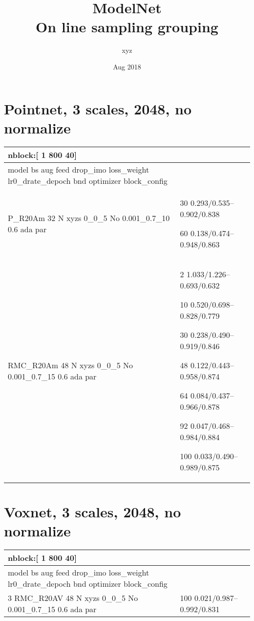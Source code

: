 \documentclass[,table,dvipsnames]{article}
\title{ModelNet \\On line sampling grouping}
\author{xyz}
\date{Aug 2018}
\begin{document}
\noindent
\begin{titlepage}
	\maketitle
\end{titlepage}	

\section{Pointnet, 3 scales, 2048, no normalize}
\noindent\begin{tabular}{|p{10cm}|p{5.5cm}| }	
\hline
nblock:[  1 800  40] &\\	\hline
model bs aug feed drop\_imo loss\_weight lr0\_drate\_depoch bnd optimizer block\_config& \\ \hline

\rowcolor{green!20}
 P\_R20Am 32 N xyzs 0\_0\_5 No 0.001\_0.7\_10 0.6 ada par & 30 0.293/0.535--0.902/0.838\par 60 0.138/0.474--0.948/0.863\\
 
\rowcolor{red!20}
RMC\_R20Am 48 N xyzs 0\_0\_5 No 0.001\_0.7\_15 0.6 ada par & 2 1.033/1.226--0.693/0.632\par 10 0.520/0.698--0.828/0.779\par 30 0.238/0.490--0.919/0.846 \par 48 0.122/0.443--0.958/0.874 \par 64 0.084/0.437--0.966/0.878 \par 92 0.047/0.468--0.984/0.884 \par 100 0.033/0.490--0.989/0.875\\
\hline 	
\end{tabular}



\section{Voxnet, 3 scales, 2048, no normalize}
\noindent\begin{tabular}{|p{10cm}|p{5.5cm}| }	
	\hline
	nblock:[  1 800  40] &\\	\hline
	model bs aug feed drop\_imo loss\_weight lr0\_drate\_depoch bnd optimizer block\_config& \\ \hline
	
	\rowcolor{green!20}
	3 RMC\_R20AV 48 N xyzs 0\_0\_5 No 0.001\_0.7\_15 0.6 ada par & 100 0.021/0.987--0.992/0.831\\
	
	\hline 	
\end{tabular}
\end{document}
